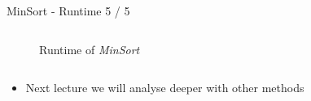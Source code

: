 \begin{frame}{MinSort - Runtime 5 / 5}
\begin{columns}
\begin{column}{0.5\textwidth}
\begin{center}
\begin{figure}
          \vspace*{-1.0em}\caption{Runtime of \textit{MinSort}}%
          \label{fig:minsort_runtime_2}%
        \end{figure}%
      \end{center}
    \end{column}%
  \end{columns}
  \begin{columns}
    \begin{column}{1.0\textwidth}
      \begin{itemize}
        \item
          Next lecture we will analyse deeper with other methods
      \end{itemize}
    \end{column}
    \begin{column}{0.0\textwidth}\end{column}
  \end{columns}
\end{frame}